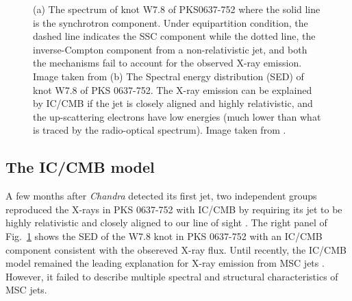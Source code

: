 \begin{figure}[h!]
    \caption{ (a) The spectrum of knot W7.8 of PKS0637-752 where the solid line is the synchrotron component. Under equipartition condition, the dashed line indicates the SSC component while the dotted line, the inverse-Compton component from a non-relativistic jet, and both the mechanisms fail to account for the observed X-ray emission. Image taken from \citet{chartas2000chandra} (b) The Spectral energy distribution (SED) of knot W7.8 of PKS 0637-752. The X-ray emission can be explained by IC/CMB if the jet is closely aligned and highly relativistic, and the up-scattering electrons have low energies (much lower than what is traced by the radio-optical spectrum). Image taken from \citet{tavecchio2000x}.
    \label{fig:w7.8_sed} }
\end{figure}

\subsection{The IC/CMB model}
A few months after \textit{Chandra} detected its first jet, two independent groups reproduced the X-rays in PKS 0637-752 with IC/CMB  by requiring its jet to be highly relativistic and closely aligned to our line of sight \citep{tavecchio2000x,celotti2001large}. The right panel of Fig.~\ref{fig:w7.8_sed} shows the SED of the W7.8 knot in PKS 0637-752 with an IC/CMB component consistent with the obsereved X-ray flux. Until recently, the IC/CMB model remained the leading explanation for X-ray emission from MSC jets \citep[e.g.,][]{sambruna2004survey,miller2006x,sambruna2006jet,2012ApJ...748...81K}. However,
it failed to describe multiple spectral and structural characteristics of MSC jets.
